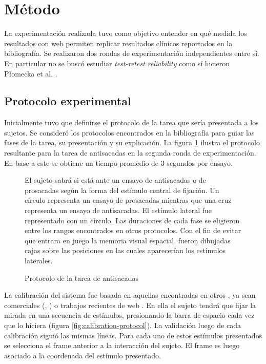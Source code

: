 \section{Método}

La experimentación realizada tuvo como objetivo entender en qué medida los
resultados con \eyetracking web permiten replicar resultados clínicos
reportados en la bibliografía.
Se realizaron dos rondas de experimentación independientes entre sí.
En particular no se buscó estudiar \textit{test-retest reliability} como sí
hicieron P{\l}omecka et al. \cite{plomecka_2020_retest_reliability}.

\subsection{Protocolo experimental}

  Inicialmente tuvo que definirse el protocolo de la tarea que sería presentada
  a los sujetos.
  Se consideró los protocolos encontrados en la bibliografía
  \cite{munoz_2004_look_away, unsworth_2011_distribution_analysis,
  olincy_1997_age_diminishes_performance} para guiar las fases de la tarea, su
  presentación y su explicación.
  La figura \ref{fig:antisaccades-protocol} ilustra el protocolo resultante para
  la tarea de antisacadas en la segunda ronda de experimentación.
  En base a este se obtiene un tiempo promedio de 3 segundos por ensayo.

  \begin{figure}
    \centering

    El sujeto sabrá si está ante un ensayo de antisacadas o de prosacadas según
    la forma del estímulo central de fijación.
    Un círculo representa un ensayo de prosacadas mientras que una cruz
    representa un ensayo de antisacadas.
    El estímulo lateral fue representado con un círculo.
    Las duraciones de cada fase se eligieron entre los rangos encontrados en
    otros protocolos.
    Con el fin de evitar que entrara en juego la memoria visual espacial,
    fueron dibujadas cajas sobre las posiciones en las cuales aparecerían los
    estímulos laterales.

    \caption{Protocolo de la tarea de antisacadas}
    \label{fig:antisaccades-protocol}
  \end{figure}

  La calibración del sistema fue basada en aquellas encontradas en otros
  \eyetrackers, ya sean \eyetrackers comerciales (\tobii, \eyelink) o trabajos
  recientes de \eyetracking web \cite{xu_2015_turker_gaze,
  papoutsaki_2016_webgazer}.
  En ella el sujeto tendrá que fijar la mirada en una secuencia de estímulos,
  presionando la barra de espacio cada vez que lo hiciera (figura
  \ref{fig:calibration-protocol}).
  La validación luego de cada calibración siguió las mismas líneas.
  Para cada uno de estos estímulos presentados se selecciona el frame anterior a
  la interacción del sujeto.
  El frame es luego asociado a la coordenada del estímulo presentado.

